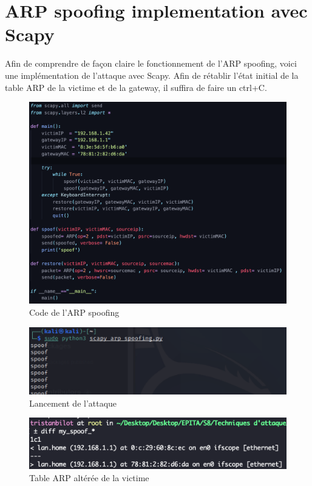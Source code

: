 \documentclass[12pt, oneside]{article}
\begin{document}
\section{ARP spoofing implementation avec Scapy}
Afin de comprendre de façon claire le fonctionnement de l'ARP spoofing, voici une implémentation de l'attaque avec Scapy. Afin de rétablir l'état initial de la table ARP de la victime et de la gateway, il suffira de faire un ctrl+C.
\begin{figure}[H]
\centering
\includegraphics[scale=0.4]{myspoofcode}
\caption{Code de l'ARP spoofing}
\end{figure}
\begin{figure}[H]
\centering
\includegraphics[scale=0.7]{myspoof}
\caption{Lancement de l'attaque}
\end{figure}
\begin{figure}[H]
\centering
\includegraphics[scale=0.7]{myspoof2}
\caption{Table ARP altérée de la victime}
\end{figure}
\end{document}
